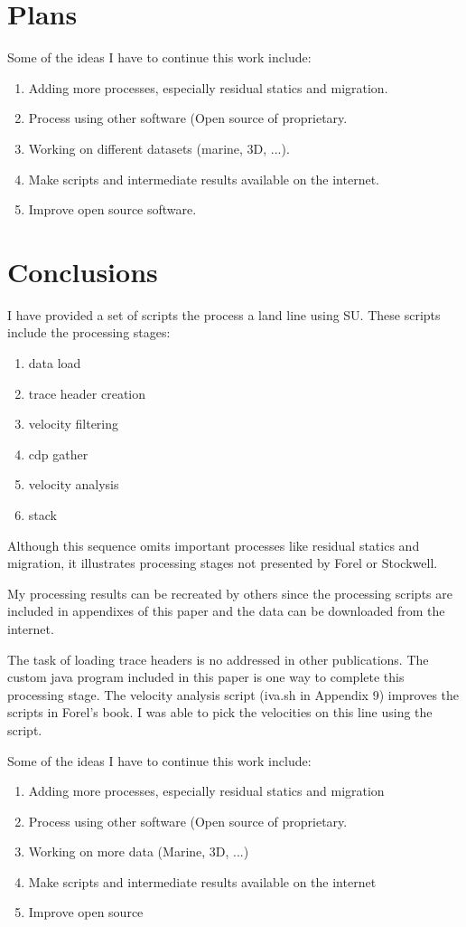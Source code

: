 \section{Plans}
Some of the ideas I have to continue this work include:

\begin{enumerate}
\item Adding more processes, especially residual statics and migration.
\item Process using other software (Open source of proprietary. 
\item Working on different datasets (marine, 3D, ...).
\item Make scripts and intermediate results available on the internet.
\item Improve open source software.
\end{enumerate}

\section{Conclusions}
I have provided a set of scripts the process a land line using SU.  These scripts include the processing stages:

\begin{enumerate}
\item data load
\item trace header creation
\item velocity filtering 
\item cdp gather
\item velocity analysis
\item stack
\end{enumerate}

Although this sequence omits important processes like residual statics
and migration, it illustrates processing stages not presented by Forel
or Stockwell.

My processing results can be recreated by others since the processing
scripts are included in appendixes of this paper and the data can be
downloaded from the internet.

The task of loading trace headers is no addressed in other
publications.  The custom java program included in this paper is one
way to complete this processing stage.  The velocity analysis script
(iva.sh in Appendix 9) improves the scripts in Forel's book.  I was
able to pick the velocities on this line using the script.

Some of the ideas I have to continue this work include:
\begin{enumerate}
\item Adding more processes, especially residual statics and migration
\item Process using other software (Open source of proprietary.
\item Working on more data (Marine, 3D, ...)
\item Make scripts and intermediate results available on the internet
\item Improve open source
\end{enumerate}





\lstset{language=python,numbers=left,numberstyle=\tiny,showstringspaces=false}

